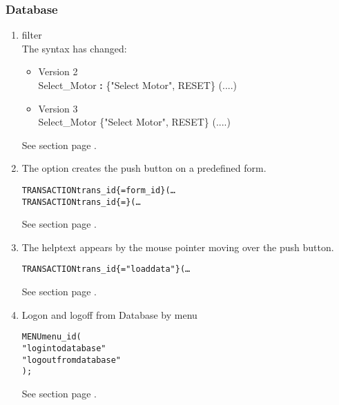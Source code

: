 \subsubsection{Database}
\begin{enumerate}
\item filter\\
The syntax has changed:
\begin{itemize}
\item Version 2 \\
Select\_Motor  {\bfseries : \FILTER} \{"Select Motor", RESET\} (....) \\
\item Version 3 \\
\FILTER{} Select\_Motor   \{"Select Motor", RESET\} (....) \\
\end{itemize}
See section  page \pageref{sec:dbfilter}. \\
\item The \FORM{} option creates the push button on a predefined form.

\begin{boxedminipage}[t]{\linewidth}
\begin{alltt}
  TRANSACTION trans_id \{ \FORM = form_id \} (\ldots
  TRANSACTION trans_id \{ \FORM = \NONE \} (\ldots
\end{alltt}
\end{boxedminipage}

See section  page \pageref{sec:dbtransactionoption}. \\
\item The helptext appears by the mouse pointer moving over the push button.

\begin{boxedminipage}[t]{\linewidth}
\begin{alltt}
  TRANSACTION trans_id \{ \HELPTEXT = "load data" \} (\ldots
\end{alltt}
\end{boxedminipage}

See section  page \pageref{sec:dbtransactionoption}. \\
\item Logon and logoff from Database by menu

\begin{boxedminipage}[t]{\linewidth}
\begin{alltt}
  MENU menu_id (
    \LOGON "login to database"
    \LOGOFF "logout from database"
  );
\end{alltt}
\end{boxedminipage}

See section  page \pageref{sec:dbmenu}. \\

\end{enumerate}
